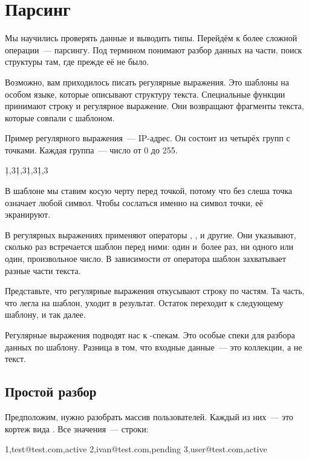 \section{Парсинг}

Мы научились проверять данные и выводить типы. Перейдём к более сложной
операции~--- парсингу. Под термином понимают разбор данных на части, поиск
структуры там, где прежде её не было.

Возможно, вам приходилось писать регулярные выражения. Это шаблоны на особом
языке, которые описывают структуру текста. Специальные функции принимают строку
и регулярное выражение. Они возвращают фрагменты текста, которые совпали с
шаблоном.

Пример регулярного выражения~--- IP-адрес. Он состоит из четырёх групп с
точками. Каждая группа~--- число от 0 до 255.


\begin{text}
\d{1,3}\.\d{1,3}\.\d{1,3}\.\d{1,3}
\end{text}

В шаблоне мы ставим косую черту перед точкой, потому что без слеша точка
означает любой символ. Чтобы сослаться именно на символ точки, её экранируют.

В регулярных выражениях применяют операторы \code{+}, , \code{*} и
другие. Они указывают, сколько раз встречается шаблон перед ними: один и~более
раз, ни одного или один, произвольное число. В зависимости от оператора шаблон
захватывает разные части текста.

Представьте, что регулярные выражения откусывают строку по частям. Та часть, что
легла на шаблон, уходит в результат. Остаток переходит к следующему шаблону, и
так далее.

Регулярные выражения подводят нас к -спекам. Это особые спеки для
разбора данных по шаблону. Разница в том, что входные данные~--- это коллекции, а не
текст.


\subsection{Простой разбор}

Предположим, нужно разобрать массив пользователей. Каждый из них~--- это кортеж
вида . Все значения~--- строки:

\begin{text}
1,test@test.com,active
2,ivan@test.com,pending
3,user@test.com,active
\end{text}

